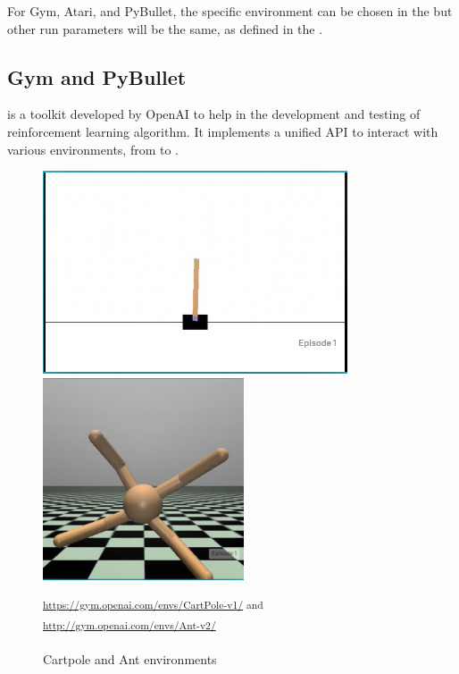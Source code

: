 For Gym, Atari, and PyBullet, the specific environment can be chosen in the  but other run parameters will be the same, as defined in the .

\subsection{Gym and PyBullet}
 is a toolkit developed by OpenAI to help in the development and testing of reinforcement learning algorithm. It implements a unified API to interact with various environments, from  to .

\begin{figure}[H]
 \centering
 \captionsetup{justification=centering, margin=0.5cm}
\includegraphics[height=6cm]{images/cartpole.PNG}
\includegraphics[height=6cm]{images/ant.PNG}
\caption{Cartpole and Ant environments}
 \small\textsuperscript{\url{https://gym.openai.com/envs/CartPole-v1/} and  \url{http://gym.openai.com/envs/Ant-v2/}}
 \label{fig:cartpole}
\end{figure}

